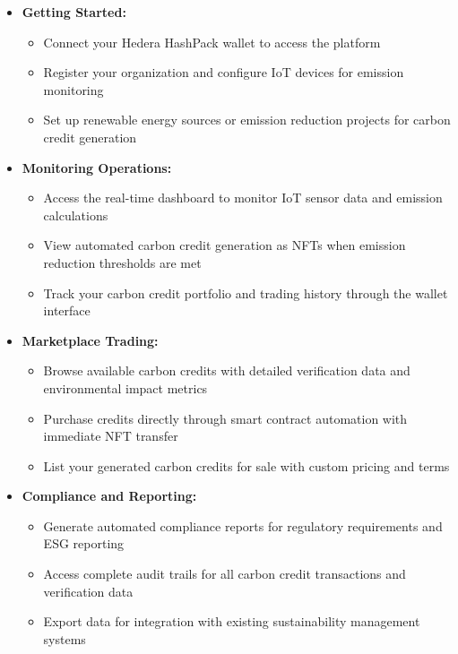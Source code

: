 \documentclass[oneside,a4paper,12pt]{book}
\begin{document}
\begin{itemize}
    \item \textbf{Getting Started:} 
    \begin{itemize}
        \item Connect your Hedera HashPack wallet to access the platform
        \item Register your organization and configure IoT devices for emission monitoring
        \item Set up renewable energy sources or emission reduction projects for carbon credit generation
    \end{itemize}

    \item \textbf{Monitoring Operations:}
    \begin{itemize}
        \item Access the real-time dashboard to monitor IoT sensor data and emission calculations
        \item View automated carbon credit generation as NFTs when emission reduction thresholds are met
        \item Track your carbon credit portfolio and trading history through the wallet interface
    \end{itemize}

    \item \textbf{Marketplace Trading:} 
    \begin{itemize}
        \item Browse available carbon credits with detailed verification data and environmental impact metrics
        \item Purchase credits directly through smart contract automation with immediate NFT transfer
        \item List your generated carbon credits for sale with custom pricing and terms
    \end{itemize}

    \item \textbf{Compliance and Reporting:}
    \begin{itemize}
        \item Generate automated compliance reports for regulatory requirements and ESG reporting
        \item Access complete audit trails for all carbon credit transactions and verification data
        \item Export data for integration with existing sustainability management systems
    \end{itemize}
\end{itemize}
\end{document}

